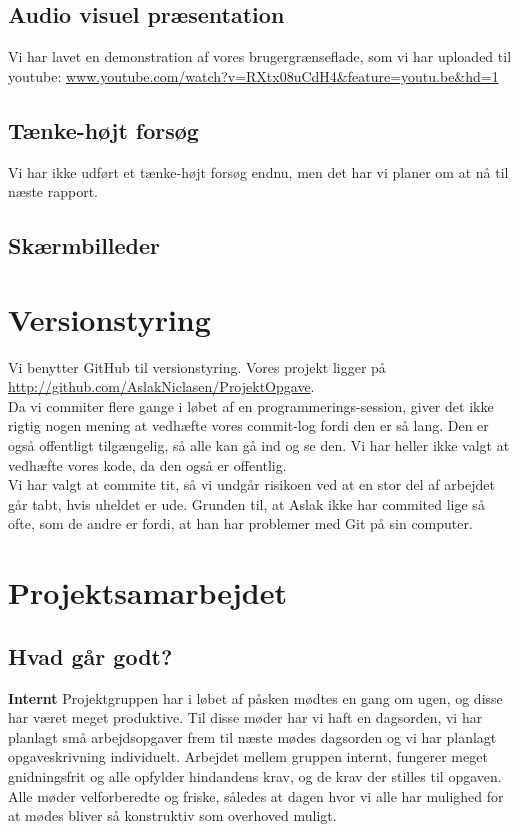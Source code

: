 \documentclass[a4paper,12pt]{article}
\begin{document}
\subsection*{Audio visuel præsentation}
Vi har lavet en demonstration af vores brugergrænseflade, som vi har uploaded til youtube:
\newline
\url{www.youtube.com/watch?v=RXtx08uCdH4&feature=youtu.be&hd=1}

\subsection*{Tænke-højt forsøg}
Vi har ikke udført et tænke-højt forsøg endnu, men det har vi planer om at nå til næste rapport.

\subsection*{Skærmbilleder}

\newpage

\section{Versionstyring}
Vi benytter GitHub til versionstyring. Vores projekt ligger på
\newline
\url{http://github.com/AslakNiclasen/ProjektOpgave}.
\newline
\\
Da vi commiter flere gange i løbet af en programmerings-session, giver det ikke rigtig nogen mening at vedhæfte vores commit-log fordi den er så lang. Den er også offentligt tilgængelig, så alle kan gå ind og se den. Vi har heller ikke valgt at vedhæfte vores kode, da den også er offentlig.
\newline
\\
Vi har valgt at commite tit, så vi undgår risikoen ved at en stor del af arbejdet går tabt, hvis uheldet er ude. Grunden til, at Aslak ikke har commited lige så ofte, som de andre er fordi, at han har problemer med Git på sin computer.


\section{Projektsamarbejdet}
\subsection{Hvad går godt?}

\textbf{Internt}
\newline
Projektgruppen har i løbet af påsken mødtes en gang om ugen, og disse har været meget produktive. Til disse møder har vi haft en dagsorden, vi har planlagt små arbejdsopgaver frem til næste mødes dagsorden og vi har planlagt opgaveskrivning individuelt. Arbejdet mellem gruppen internt, fungerer meget gnidningsfrit og alle opfylder hindandens krav, og de krav der stilles til opgaven. Alle møder velforberedte og friske, således at dagen hvor vi alle har mulighed for at mødes bliver så konstruktiv som overhoved muligt.
\end{document}
